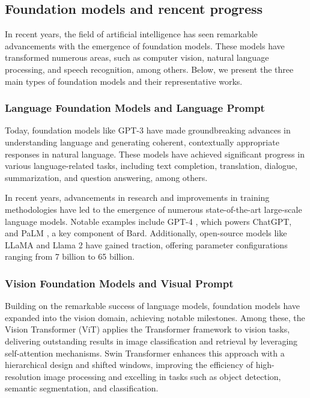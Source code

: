 \subsection{Foundation models and rencent progress}

In recent years, the field of artificial intelligence has seen remarkable advancements with the emergence of foundation models. These models have transformed numerous areas, such as computer vision, natural language processing, and speech recognition, among others. Below, we present the three main types of foundation models and their representative works.

\subsubsection{Language Foundation Models and Language Prompt}

Today, foundation models like GPT-3 \cite{back10} have made groundbreaking advances in understanding language and generating coherent, contextually appropriate responses in natural language. These models have achieved significant progress in various language-related tasks, including text completion, translation, dialogue, summarization, and question answering, among others.

In recent years, advancements in research and improvements in training methodologies have led to the emergence of numerous state-of-the-art large-scale language models. Notable examples include GPT-4 \cite{back11}, which powers ChatGPT, and PaLM \cite{back12}, a key component of Bard. Additionally, open-source models like LLaMA \cite{back13} and Llama 2 \cite{back14} have gained traction, offering parameter configurations ranging from 7 billion to 65 billion. 

\subsubsection{Vision Foundation Models and Visual Prompt}

Building on the remarkable success of language models, foundation models have expanded into the vision domain, achieving notable milestones. Among these, the Vision Transformer (ViT) \cite{back15} applies the Transformer framework to vision tasks, delivering outstanding results in image classification and retrieval by leveraging self-attention mechanisms. Swin Transformer \cite{back16} enhances this approach with a hierarchical design and shifted windows, improving the efficiency of high-resolution image processing and excelling in tasks such as object detection, semantic segmentation, and classification.

